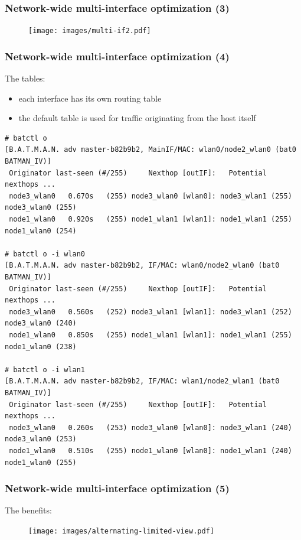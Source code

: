 \documentclass[slidestop]{beamer}
\begin{document}
\begin{frame}[c]
	\frametitle{Network-wide multi-interface optimization (3)}

	\begin{figure}
		\centering
		\texttt{[image: images/multi-if2.pdf]}
	\end{figure}
\end{frame}

\begin{frame}[c,fragile]
	\frametitle{Network-wide multi-interface optimization (4)}

	The tables:

	\begin{itemize}
		\item each interface has its own routing table
		\item the default table is used for traffic originating from the host itself
	\end{itemize}

	\begin{lstlisting}[basicstyle=\tiny]
# batctl o
[B.A.T.M.A.N. adv master-b82b9b2, MainIF/MAC: wlan0/node2_wlan0 (bat0 BATMAN_IV)]
 Originator last-seen (#/255)     Nexthop [outIF]:   Potential nexthops ...
 node3_wlan0   0.670s   (255) node3_wlan0 [wlan0]: node3_wlan1 (255) node3_wlan0 (255)
 node1_wlan0   0.920s   (255) node1_wlan1 [wlan1]: node1_wlan1 (255) node1_wlan0 (254)

# batctl o -i wlan0
[B.A.T.M.A.N. adv master-b82b9b2, IF/MAC: wlan0/node2_wlan0 (bat0 BATMAN_IV)]
 Originator last-seen (#/255)     Nexthop [outIF]:   Potential nexthops ...
 node3_wlan0   0.560s   (252) node3_wlan1 [wlan1]: node3_wlan1 (252) node3_wlan0 (240)
 node1_wlan0   0.850s   (255) node1_wlan1 [wlan1]: node1_wlan1 (255) node1_wlan0 (238)

# batctl o -i wlan1
[B.A.T.M.A.N. adv master-b82b9b2, IF/MAC: wlan1/node2_wlan1 (bat0 BATMAN_IV)]
 Originator last-seen (#/255)     Nexthop [outIF]:   Potential nexthops ...
 node3_wlan0   0.260s   (253) node3_wlan0 [wlan0]: node3_wlan1 (240) node3_wlan0 (253)
 node1_wlan0   0.510s   (255) node1_wlan0 [wlan0]: node1_wlan1 (240) node1_wlan0 (255)
	\end{lstlisting}

\end{frame}

\begin{frame}[c]
	\frametitle{Network-wide multi-interface optimization (5)}

	The benefits:
	\begin{figure}
		\centering
		\texttt{[image: images/alternating-limited-view.pdf]}
	\end{figure}
\end{frame}
\end{document}
